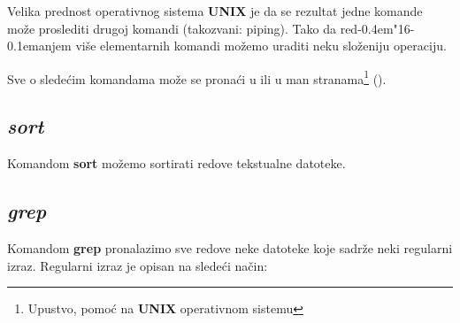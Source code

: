 \documentclass[12pt,a4paper]{article}
\def\d{d\kern-0.4em\char"16\kern-0.1em}
\begin{document}
    Velika prednost operativnog sistema {\bf UNIX} je da se rezultat jedne
    komande mo\v ze proslediti drugoj komandi (takozvani: piping).
    Tako da re\d a\-njem vi\v se elementarnih komandi mo\v zemo uraditi neku
    slo\v zeniju operaciju.

    Sve o slede\'cim komandama mo\v ze se prona\'ci u \cite{UNIX} ili u man
    stranama\footnote{Upustvo, pomo\'c na {\bf UNIX} operativnom sistemu}
    (\cite{MAN}).
%
    \subsection{\em sort}
      Komandom {\bf sort} mo\v zemo sortirati redove tekstualne datoteke.
%
    \subsection{\em grep}
      \label{sub:grep}
      Komandom {\bf grep} pronalazimo sve redove neke datoteke koje sadr\v ze
      neki regu\-larni izraz.
      Regularni izraz je opisan na slede\'ci na\v cin:
\end{document}
